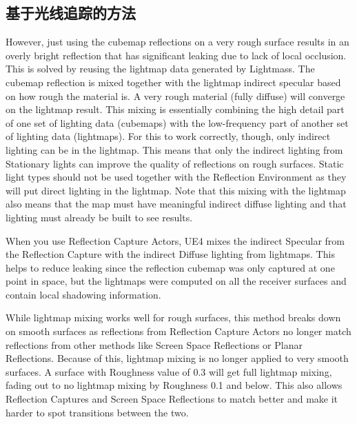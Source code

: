 \subsection{基于光线追踪的方法}
However, just using the cubemap reflections on a very rough surface results in an overly bright reflection that has significant leaking due to lack of local occlusion. This is solved by reusing the lightmap data generated by Lightmass. The cubemap reflection is mixed together with the lightmap indirect specular based on how rough the material is. A very rough material (fully diffuse) will converge on the lightmap result. This mixing is essentially combining the high detail part of one set of lighting data (cubemaps) with the low-frequency part of another set of lighting data (lightmaps). For this to work correctly, though, only indirect lighting can be in the lightmap. This means that only the indirect lighting from Stationary lights can improve the quality of reflections on rough surfaces. Static light types should not be used together with the Reflection Environment as they will put direct lighting in the lightmap. Note that this mixing with the lightmap also means that the map must have meaningful indirect diffuse lighting and that lighting must already be built to see results.




When you use Reflection Capture Actors, UE4 mixes the indirect Specular from the Reflection Capture with the indirect Diffuse lighting from lightmaps. This helps to reduce leaking since the reflection cubemap was only captured at one point in space, but the lightmaps were computed on all the receiver surfaces and contain local shadowing information.


While lightmap mixing works well for rough surfaces, this method breaks down on smooth surfaces as reflections from Reflection Capture Actors no longer match reflections from other methods like Screen Space Reflections or Planar Reflections. Because of this, lightmap mixing is no longer applied to very smooth surfaces. A surface with Roughness value of 0.3 will get full lightmap mixing, fading out to no lightmap mixing by Roughness 0.1 and below. This also allows Reflection Captures and Screen Space Reflections to match better and make it harder to spot transitions between the two.